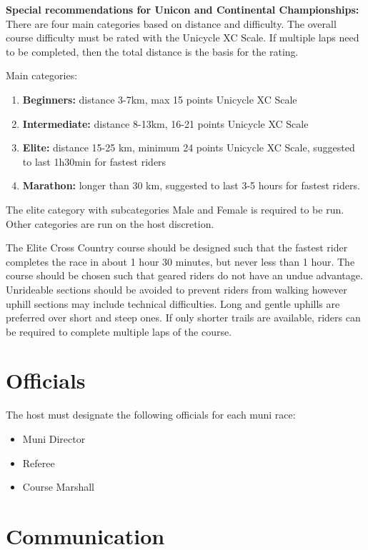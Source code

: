 \textbf{Special recommendations for Unicon and Continental Championships:}\\
There are four main categories based on distance and difficulty.
The overall course difficulty must be rated with the Unicycle XC Scale.
If multiple laps need to be completed, then the total distance is the basis for the rating.

Main categories:
\begin{enumerate}
\item \textbf{Beginners:} distance 3-7km, max 15 points Unicycle XC Scale
\item \textbf{Intermediate:} distance 8-13km, 16-21 points Unicycle XC Scale
\item \textbf{Elite:} distance 15-25 km, minimum 24 points Unicycle XC Scale, suggested to last 1h30min for fastest riders
\item \textbf{Marathon:} longer than 30 km, suggested to last 3-5 hours for fastest riders.
\end{enumerate}

The elite category with subcategories Male and Female is required to be run.
Other categories are run on the host discretion.

The Elite Cross Country course should be designed such that the fastest rider completes the race in about 1 hour 30 minutes, but never less than 1 hour.
The course should be chosen such that geared riders do not have an undue advantage.
Unrideable sections should be avoided to prevent riders from walking however uphill sections may include technical difficulties.
Long and gentle uphills are preferred over short and steep ones.
If only shorter trails are available, riders can be required to complete multiple laps of the course.

\section{Officials}

The host must designate the following officials for each muni race:
\begin{itemize}
\item Muni Director
\item Referee
\item Course Marshall
\end{itemize}

\section{Communication}

